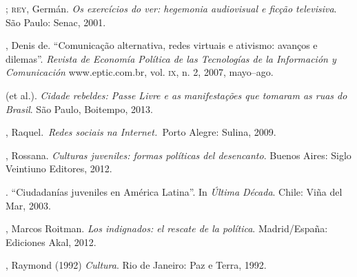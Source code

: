\begin{bibliohedra}
\titidem; \textsc{rey}, Germán. \emph{Os exercícios do ver:
hegemonia audiovisual e ficção televisiva}. São Paulo: Senac, 2001.

, Denis de. ``Comunicação alternativa, redes virtuais e ativismo:
avanços e dilemas''. \emph{Revista de Economía Política de las
Tecnologías de la Información y Comunicación} www.eptic.com.br, vol. \textsc{ix},
n. 2, 2007, mayo--ago.

 (et al.). \emph{Cidade rebeldes: Passe Livre e as
manifestações que tomaram as ruas do Brasil}. São Paulo, Boitempo, 2013.

, Raquel.~\emph{Redes sociais na Internet.~}Porto Alegre: Sulina,
2009.

, Rossana. \emph{Culturas juveniles: formas políticas del
desencanto}. Buenos Aires: Siglo Veintiuno Editores, 2012.

\titidem. ``Ciudadanías juveniles en América
Latina''. In \emph{Última Década}. Chile: Viña del Mar, 2003.

, Marcos Roitman. \emph{Los indignados: el rescate de la
política}. Madrid/España: Ediciones Akal, 2012.

, Raymond (1992) \emph{Cultura}. Rio de Janeiro: Paz e Terra,
1992.
\end{bibliohedra}



\begin{flushright}
\end{flushright}

